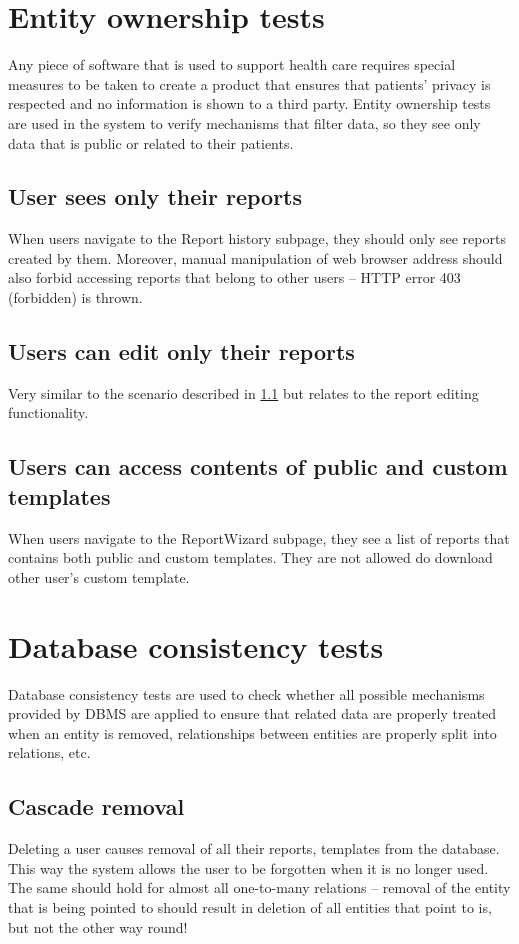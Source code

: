 \documentclass[12pt, twoside, openany]{report}
\theoremstyle{definition}
\begin{document}
\section{Entity ownership tests}
Any piece of software that is used to support health care requires special measures to be taken to create a product that ensures that patients' privacy is respected and no information is shown to a third party. Entity ownership tests are used in the system to verify mechanisms that filter data, so they see only data that is public or related to their patients. 

\subsection{User sees only their reports}\label{report-owner}
When users navigate to the Report history subpage, they should only see reports created by them. Moreover, manual manipulation of web browser address should also forbid accessing reports that belong to other users -- HTTP error 403 (forbidden) is thrown.
\subsection{Users can edit only their reports}
Very similar to the scenario described in \ref{report-owner} but relates to the report editing functionality.

\subsection{Users can access contents of public and custom templates}
When users navigate to the ReportWizard subpage, they see a list of reports that contains both public and custom templates. They are not allowed do download other user's custom template.


\section{Database consistency tests}
Database consistency tests are used to check whether all possible mechanisms provided by DBMS are applied to ensure that related data are properly treated when an entity is removed, relationships between entities are properly split into relations, etc.

\subsection{Cascade removal}
	Deleting a user causes removal of all their reports, templates from the database. This way the system allows the user to be forgotten when it is no longer used.
	The same should hold for almost all one-to-many relations – removal of the entity that is being pointed to should result in deletion of all entities that point to is, but not the other way round!
\end{document}

